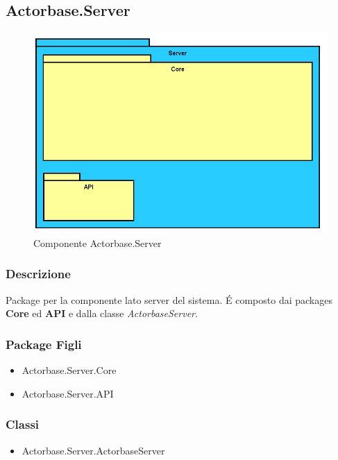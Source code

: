 \documentclass[a4paper]{article}
\begin{document}
		\subsection{Actorbase.Server}
			\begin{figure} [H]
			\centering
			\includegraphics[scale=0.50]{Server/Package/ServerLevel.png}
			\caption{Componente Actorbase.Server}
			\end{figure}
			\subsubsection{Descrizione}
				Package per la componente lato server del sistema. \'E composto dai packages \textbf{Core} ed \textbf{API} e dalla classe \emph{ActorbaseServer}.
			\subsubsection{Package Figli}
				\begin{itemize}
					\item Actorbase.Server.Core
					\item Actorbase.Server.API
				\end{itemize}
			\subsubsection{Classi}
			\begin{itemize}
				\item Actorbase.Server.ActorbaseServer
			\end{itemize}
\end{document}
